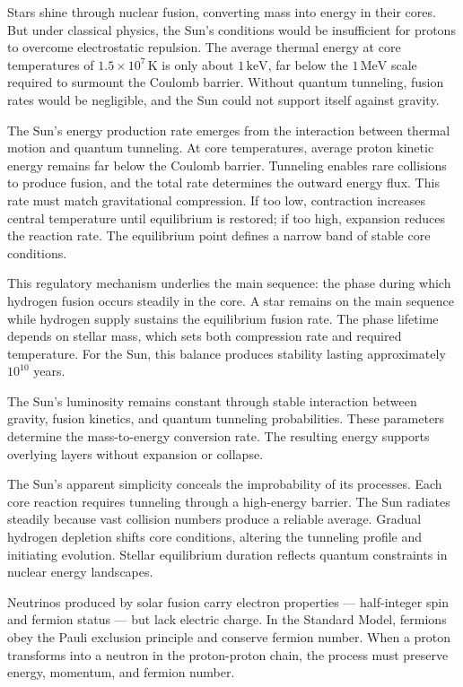 Stars shine through nuclear fusion, converting mass into energy in their cores. But under classical physics, the Sun's conditions would be insufficient for protons to overcome electrostatic repulsion. The average thermal energy at core temperatures of $1.5 \times 10^7\,\text{K}$ is only about $1\,\text{keV}$, far below the $1\,\text{MeV}$ scale required to surmount the Coulomb barrier. Without quantum tunneling, fusion rates would be negligible, and the Sun could not support itself against gravity.

The Sun's energy production rate emerges from the interaction between thermal motion and quantum tunneling. At core temperatures, average proton kinetic energy remains far below the Coulomb barrier. Tunneling enables rare collisions to produce fusion, and the total rate determines the outward energy flux. This rate must match gravitational compression. If too low, contraction increases central temperature until equilibrium is restored; if too high, expansion reduces the reaction rate. The equilibrium point defines a narrow band of stable core conditions.

This regulatory mechanism underlies the main sequence: the phase during which hydrogen fusion occurs steadily in the core. A star remains on the main sequence while hydrogen supply sustains the equilibrium fusion rate. The phase lifetime depends on stellar mass, which sets both compression rate and required temperature. For the Sun, this balance produces stability lasting approximately $10^{10}$ years.

The Sun's luminosity remains constant through stable interaction between gravity, fusion kinetics, and quantum tunneling probabilities. These parameters determine the mass-to-energy conversion rate. The resulting energy supports overlying layers without expansion or collapse.

The Sun's apparent simplicity conceals the improbability of its processes. Each core reaction requires tunneling through a high-energy barrier. The Sun radiates steadily because vast collision numbers produce a reliable average. Gradual hydrogen depletion shifts core conditions, altering the tunneling profile and initiating evolution. Stellar equilibrium duration reflects quantum constraints in nuclear energy landscapes.

Neutrinos produced by solar fusion carry electron properties — half-integer spin and fermion status — but lack electric charge. In the Standard Model, fermions obey the Pauli exclusion principle and conserve fermion number. When a proton transforms into a neutron in the proton-proton chain, the process must preserve energy, momentum, and fermion number.

